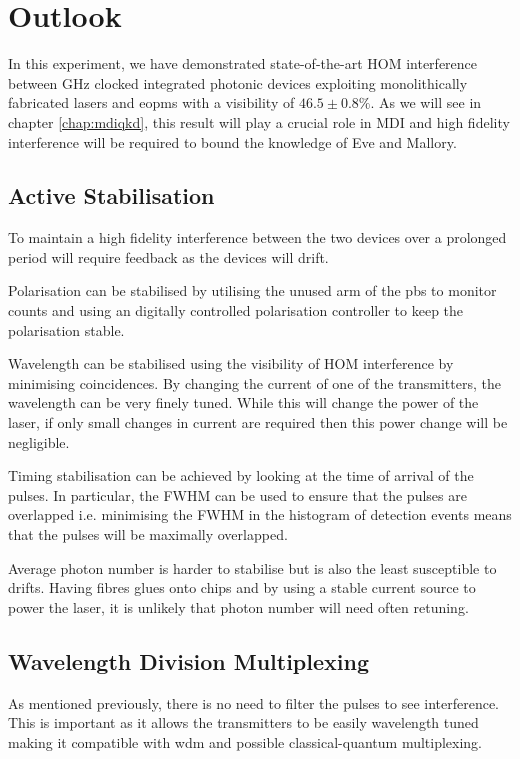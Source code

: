 \section{Outlook}

In this experiment, we have demonstrated state-of-the-art \acl{HOM} interference between GHz clocked integrated photonic devices exploiting monolithically fabricated lasers and \acp{eopm} with a visibility of $46.5\pm 0.8\%$. As we will see in chapter \ref{chap:mdiqkd}, this result will play a crucial role in \ac{MDI} and high fidelity interference will be required to bound the knowledge of Eve and Mallory.

\subsection{Active Stabilisation}

To maintain a high fidelity interference between the two devices over a prolonged period will require feedback as the devices will drift. 

Polarisation can be stabilised by utilising the unused arm of the \ac{pbs} to monitor counts and using an digitally controlled polarisation controller to keep the polarisation stable.

Wavelength can be stabilised using the visibility of \ac{HOM} interference by minimising coincidences. By changing the current of one of the transmitters, the wavelength can be very finely tuned. While this will change the power of the laser, if only small changes in current are required then this power change will be negligible.

Timing stabilisation can be achieved by looking at the time of arrival of the pulses. In particular, the \ac{FWHM} can be used to ensure that the pulses are overlapped i.e. minimising the \ac{FWHM} in the histogram of detection events means that the pulses will be maximally overlapped.

Average photon number is harder to stabilise but is also the least susceptible to drifts. Having fibres glues onto chips and by using a stable current source to power the laser, it is unlikely that photon number will need often retuning.

\subsection{Wavelength Division Multiplexing}

As mentioned previously, there is no need to filter the pulses to see interference. This is important as it allows the transmitters to be easily wavelength tuned making it compatible with \ac{wdm} and possible classical-quantum multiplexing. 

